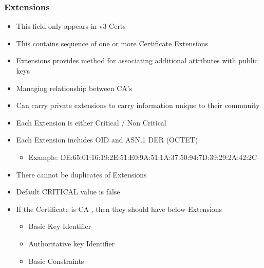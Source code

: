 \documentclass[a4paper]{article}
\begin{document}
    \subsubsection{Extensions}
        \begin{itemize}
            \item This field only appears in v3 Certs
            \item This contains sequence of one or more Certificate Extensions 
            \item Extensions provides method for associating additional attributes with public keys
            \item Managing relationship between CA's
            \item Can carry private extensions to carry information unique to their community
            \item Each Extension is either Critical / Non Critical
            \item Each Extension includes OID and ASN.1 DER  (OCTET)
                \begin{itemize}
                    \item Example: DE:65:01:16:19:2E:51:E0:9A:51:1A:37:50:94:7D:39:29:2A:42:2C
                \end{itemize}
            \item There cannot be duplicates of Extensions
            \item Default CRITICAL value is false
            \item If the Certificate is CA , then they should have below Extensions
                \begin{itemize}
                    \item Basic Key Identifier
                    \item Authoritative key Identifier
                    \item Basic Constraints
                \end{itemize}
        \end{itemize}
\end{document}
